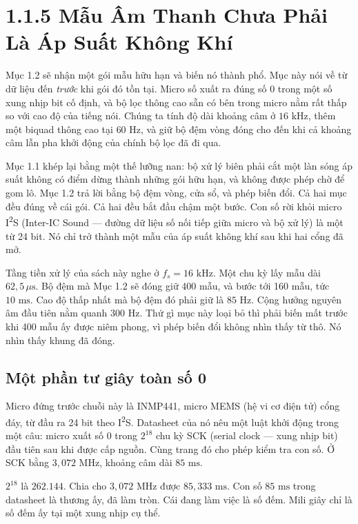 \documentclass[11pt,a4paper]{article}
\begin{document}
\section*{1.1.5 Mẫu Âm Thanh Chưa Phải Là Áp Suất Không Khí}

\begin{learningobj}
Mục 1.2 sẽ nhận một gói mẫu hữu hạn và biến nó thành phổ. Mục này nói về từ dữ liệu đến \emph{trước} khi gói đó tồn tại. Micro số xuất ra đúng số 0 trong một số xung nhịp bit cố định, và bộ lọc thông cao sẵn có bên trong micro nằm rất thấp so với cao độ của tiếng nói. Chúng ta tính độ dài khoảng câm ở $16\text{ kHz}$, thêm một biquad thông cao tại $60\text{ Hz}$, và giữ bộ đệm vòng đóng cho đến khi cả khoảng câm lẫn pha khởi động của chính bộ lọc đã đi qua.
\end{learningobj}

Mục 1.1 khép lại bằng một thế lưỡng nan: bộ xử lý biên phải cắt một làn sóng áp suất không có điểm dừng thành những gói hữu hạn, và không được phép chờ để gom lô. Mục 1.2 trả lời bằng bộ đệm vòng, cửa sổ, và phép biến đổi. Cả hai mục đều đúng về cái gói. Cả hai đều bắt đầu chậm một bước. Con số rời khỏi micro I\textsuperscript{2}S (Inter-IC Sound --- đường dữ liệu số nối tiếp giữa micro và bộ xử lý) là một từ 24 bit. Nó chỉ trở thành một mẫu của áp suất không khí sau khi hai cổng đã mở.

Tầng tiền xử lý của sách này nghe ở $f_s = 16\text{ kHz}$. Một chu kỳ lấy mẫu dài $62{,}5\,\mu\text{s}$. Bộ đệm mà Mục 1.2 sẽ đóng giữ 400 mẫu, và bước tới 160 mẫu, tức $10\text{ ms}$. Cao độ thấp nhất mà bộ đệm đó phải giữ là $85\text{ Hz}$. Cộng hưởng nguyên âm đầu tiên nằm quanh $300\text{ Hz}$. Thứ gì mục này loại bỏ thì phải biến mất trước khi 400 mẫu ấy được niêm phong, vì phép biến đổi không nhìn thấy từ thô. Nó nhìn thấy khung đã đóng.

\subsection*{Một phần tư giây toàn số 0}

Micro đứng trước chuỗi này là INMP441, micro MEMS (hệ vi cơ điện tử) cổng đáy, từ đầu ra 24 bit theo I\textsuperscript{2}S. Datasheet của nó nêu một luật khởi động trong một câu: micro xuất số 0 trong $2^{18}$ chu kỳ SCK (serial clock --- xung nhịp bit) đầu tiên sau khi được cấp nguồn. Cùng trang đó cho phép kiểm tra con số. Ở SCK bằng $3{,}072\text{ MHz}$, khoảng câm dài $85\text{ ms}$.

$2^{18}$ là $262.144$. Chia cho $3{,}072\text{ MHz}$ được $85{,}333\text{ ms}$. Con số $85\text{ ms}$ trong datasheet là thương ấy, đã làm tròn. Cái đang làm việc là số đếm. Mili giây chỉ là số đếm ấy tại một xung nhịp cụ thể.
\end{document}
